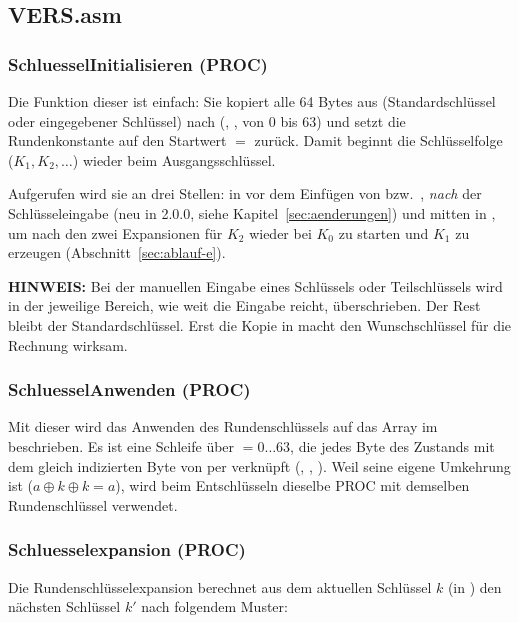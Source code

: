 \subsection{VERS.asm}
\subsubsection{SchluesselInitialisieren (PROC)}\label{sec:vers-schluessel}
Die Funktion dieser  ist einfach: Sie kopiert alle 64 Bytes aus  (Standardschlüssel oder eingegebener Schlüssel) nach  (, ,  von 0 bis 63) und setzt die Rundenkonstante  auf den Startwert  $=$  zurück. Damit beginnt die Schlüsselfolge ($K_1, K_2,\ldots$) wieder beim Ausgangsschlüssel.

Aufgerufen wird sie an drei Stellen: in  vor dem Einfügen von  bzw.\ , \emph{nach} der Schlüsseleingabe (neu in 2.0.0, siehe Kapitel~\ref{sec:aenderungen}) und mitten in , um nach den zwei Expansionen für $K_2$ wieder bei $K_0$ zu starten und $K_1$ zu erzeugen (Abschnitt~\ref{sec:ablauf-e}).

\textbf{HINWEIS:} Bei der manuellen Eingabe eines Schlüssels oder Teilschlüssels wird in  der jeweilige Bereich, wie weit die Eingabe reicht, überschrieben. Der Rest bleibt der Standardschlüssel. Erst die Kopie in  macht den Wunschschlüssel für die Rechnung wirksam.

\subsubsection{SchluesselAnwenden (PROC)}
Mit dieser  wird das Anwenden des Rundenschlüssels auf das Array im  beschrieben. Es ist eine Schleife über  $=0\ldots63$, die jedes Byte des Zustands mit dem gleich indizierten Byte von  per  verknüpft (, , ). Weil  seine eigene Umkehrung ist ($a\oplus k\oplus k=a$), wird beim Entschlüsseln dieselbe PROC mit demselben Rundenschlüssel verwendet.

\subsubsection{Schluesselexpansion (PROC)}
Die Rundenschlüsselexpansion berechnet aus dem aktuellen Schlüssel $k$ (in ) den nächsten Schlüssel $k'$ nach folgendem Muster:

